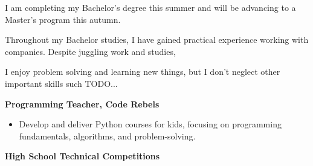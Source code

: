 \documentclass[10pt,a4paper,ragged2e]{altacv}
\begin{document}


\begin{fullwidth}
\makecvheader
\end{fullwidth}



I am completing my Bachelor's degree this summer and will be advancing to a Master's program this autumn.

\vspace{4px}

Throughout my Bachelor studies, I have gained practical experience working with companies.
Despite juggling work and studies,

\vspace{4px}

I enjoy problem solving and learning new things, but I don't neglect other important skills such TODO...

\vspace{8px}




\vspace{8px}


\textbf{Programming Teacher, Code Rebels}

\vspace{2px}

\begin{itemize}
\item Develop and deliver Python courses for kids, focusing on programming fundamentals, algorithms, and problem-solving.
\end{itemize}

\vspace{4px}

\textbf{High School Technical Competitions}

\vspace{2px}
\end{document}
